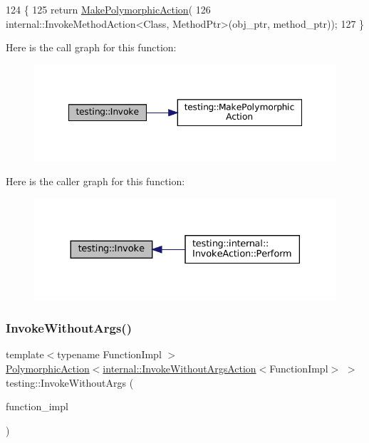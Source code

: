 \begin{DoxyCode}
124                                           \{
125   \textcolor{keywordflow}{return} \hyperlink{namespacetesting_a36bd06c5ea972c6df0bd9f40a7a94c65}{MakePolymorphicAction}(
126       internal::InvokeMethodAction<Class, MethodPtr>(obj\_ptr, method\_ptr));
127 \}
\end{DoxyCode}
Here is the call graph for this function\+:
\nopagebreak
\begin{figure}[H]
\begin{center}
\leavevmode
\includegraphics[width=348pt]{namespacetesting_a80b82dc382445d240ff011f9c34aefc4_cgraph}
\end{center}
\end{figure}
Here is the caller graph for this function\+:
\nopagebreak
\begin{figure}[H]
\begin{center}
\leavevmode
\includegraphics[width=330pt]{namespacetesting_a80b82dc382445d240ff011f9c34aefc4_icgraph}
\end{center}
\end{figure}
\mbox{\label{namespacetesting_a88cc1999296bc630f6a49cdf66bb21f9}} 
\subsubsection{\texorpdfstring{Invoke\+Without\+Args()}{InvokeWithoutArgs()}\hspace{0.1cm}{\footnotesize\ttfamily [1/2]}}
{\footnotesize\ttfamily template$<$typename Function\+Impl $>$ \\
\hyperlink{classtesting_1_1PolymorphicAction}{Polymorphic\+Action}$<$\hyperlink{classtesting_1_1internal_1_1InvokeWithoutArgsAction}{internal\+::\+Invoke\+Without\+Args\+Action}$<$Function\+Impl$>$ $>$ testing\+::\+Invoke\+Without\+Args (\begin{DoxyParamCaption}\item[{Function\+Impl}]{function\+\_\+impl }\end{DoxyParamCaption})}



